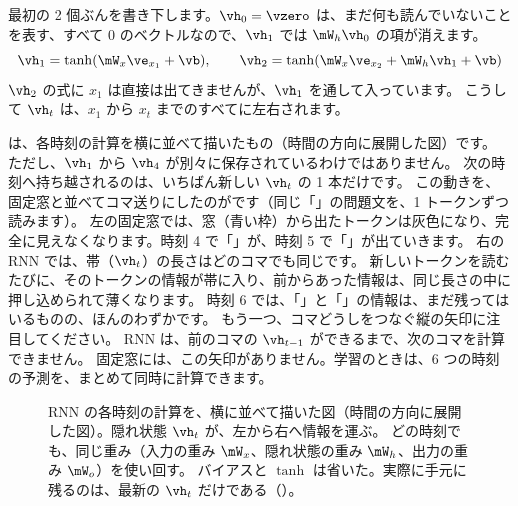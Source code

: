 最初の 2 個ぶんを書き下します。$\vh_0=\vzero$ は、まだ何も読んでいないことを表す、すべて 0 のベクトルなので、$\vh_1$ では $\mW_h\vh_0$ の項が消えます。
\[
\vh_1 = \tanh(\mW_x\ve_{x_1}+\vb),\qquad
\vh_2 = \tanh(\mW_x\ve_{x_2}+\mW_h\vh_1+\vb)
\]
$\vh_2$ の式に $x_1$ は直接は出てきませんが、$\vh_1$ を通して入っています。
こうして $\vh_t$ は、$x_1$ から $x_t$ までのすべてに左右されます。

は、各時刻の計算を横に並べて描いたもの（時間の方向に展開した図）です。
ただし、$\vh_1$ から $\vh_4$ が別々に保存されているわけではありません。
次の時刻へ持ち越されるのは、いちばん新しい $\vh_t$ の 1 本だけです。
この動きを、固定窓と並べてコマ送りにしたのがです（同じ「」の問題文を、1 トークンずつ読みます）。
左の固定窓では、窓（青い枠）から出たトークンは灰色になり、完全に見えなくなります。時刻 4 で「」が、時刻 5 で「」が出ていきます。
右の RNN では、帯（$\vh_t$）の長さはどのコマでも同じです。
新しいトークンを読むたびに、そのトークンの情報が帯に入り、前からあった情報は、同じ長さの中に押し込められて薄くなります。
時刻 6 では、「」と「」の情報は、まだ残ってはいるものの、ほんのわずかです。
もう一つ、コマどうしをつなぐ縦の矢印に注目してください。
RNN は、前のコマの $\vh_{t-1}$ ができるまで、次のコマを計算できません。
固定窓には、この矢印がありません。学習のときは、6 つの時刻の予測を、まとめて同時に計算できます。


\begin{figure}[tbp]
\centering
{}
\caption{RNN の各時刻の計算を、横に並べて描いた図（時間の方向に展開した図）。隠れ状態 $\vh_t$ が、左から右へ情報を運ぶ。
どの時刻でも、同じ重み（入力の重み $\mW_x$、隠れ状態の重み $\mW_h$、出力の重み $\mW_o$）を使い回す。
バイアスと $\tanh$ は省いた。実際に手元に残るのは、最新の $\vh_t$ だけである（）。}
\label{fig:emb-rnn}
\end{figure}

